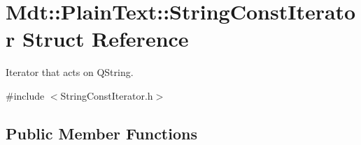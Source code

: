 \hypertarget{struct_mdt_1_1_plain_text_1_1_string_const_iterator}{}\section{Mdt\+:\+:Plain\+Text\+:\+:String\+Const\+Iterator Struct Reference}
\label{struct_mdt_1_1_plain_text_1_1_string_const_iterator}


Iterator that acts on Q\+String.  




{\ttfamily \#include $<$String\+Const\+Iterator.\+h$>$}

\subsection*{Public Member Functions}
